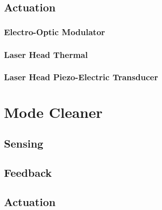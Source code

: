 \subsection{Actuation}
\subsubsection{Electro-Optic Modulator}
\subsubsection{Laser Head Thermal}
\subsubsection{Laser Head Piezo-Electric Transducer}

\section{Mode Cleaner}

\subsection{Sensing}

\subsection{Feedback}

\subsection{Actuation}
